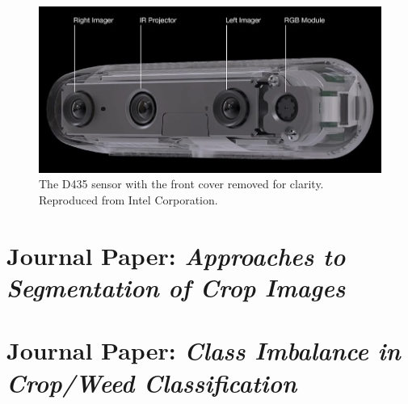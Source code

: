 \documentclass[letterpaper, notitlepage]{report}
\begin{document}
 \begin{figure}[H]
	\centering
	\includegraphics[width=0.6\linewidth]{./figures/d435.jpg}
	\caption[D435 Components]{The D435 sensor with the front cover removed for clarity. Reproduced from Intel Corporation.}
	\label{fig:d435}
\end{figure}




\newpage
\chapter{Journal Paper:  \textit{Approaches to Segmentation of Crop Images}}

\newpage
\chapter{Journal Paper: \textit{Class Imbalance in Crop/Weed Classification}}

\end{document}
